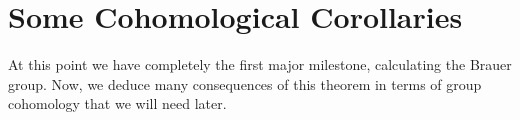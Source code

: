 
%
%




\newcommand{\category}[1]{\textsf{#1}}









\title{}




\section{Some Cohomological Corollaries}

At this point we have completely the first major 
milestone, calculating the Brauer group.
Now, we deduce many consequences of this theorem 
in terms of group cohomology that we will need later.

